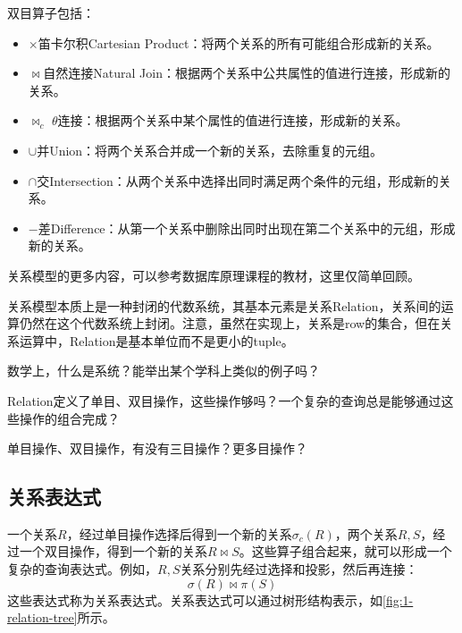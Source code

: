 双目算子包括：
\begin{itemize}
    \item $\times$笛卡尔积Cartesian Product：将两个关系的所有可能组合形成新的关系。
    \item $\bowtie$自然连接Natural Join：根据两个关系中公共属性的值进行连接，形成新的关系。
    \item $\bowtie_{c}$ $\theta$连接：根据两个关系中某个属性的值进行连接，形成新的关系。
    \item $\cup$并Union：将两个关系合并成一个新的关系，去除重复的元组。
    \item $\cap$交Intersection：从两个关系中选择出同时满足两个条件的元组，形成新的关系。
    \item $-$差Difference：从第一个关系中删除出同时出现在第二个关系中的元组，形成新的关系。
\end{itemize}

关系模型的更多内容，可以参考数据库原理课程的教材\cite{Ullman1998A}，这里仅简单回顾。

关系模型本质上是一种封闭的代数系统，其基本元素是关系Relation，关系间的运算仍然在这个代数系统上封闭。注意，虽然在实现上，关系是row的集合，但在关系运算中，Relation是基本单位而不是更小的tuple。

\begin{exercise}
    数学上，什么是系统？能举出某个学科上类似的例子吗？
\end{exercise}
\begin{exercise}
    Relation定义了单目、双目操作，这些操作够吗？一个复杂的查询总是能够通过这些操作的组合完成？
\end{exercise}
\begin{exercise}
    单目操作、双目操作，有没有三目操作？更多目操作？
\end{exercise}

\subsection{关系表达式}

一个关系$R$，经过单目操作选择后得到一个新的关系$\sigma_c(R)$，两个关系$R,S$，经过一个双目操作，得到一个新的关系$R\bowtie S$。这些算子组合起来，就可以形成一个复杂的查询表达式。例如，$R,S$关系分别先经过选择和投影，然后再连接：
$$\sigma(R) \bowtie \pi(S)$$
这些表达式称为关系表达式。关系表达式可以通过树形结构表示，如\figurename\ref{fig:1-relation-tree}所示。

